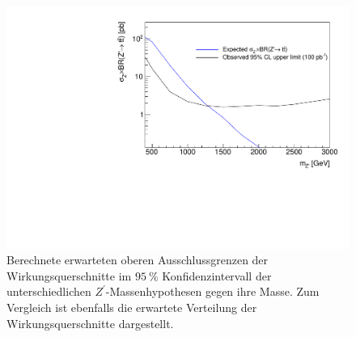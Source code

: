 \begin{figure}
    \centering
    \includegraphics[width=\linewidth]{plots_and_txt/limits.pdf}
    \caption{Berechnete erwarteten oberen Ausschlussgrenzen der Wirkungsquerschnitte im $\SI{95}{\percent}$ Konfidenzintervall der unterschiedlichen $Z^\prime$-Massenhypothesen gegen ihre Masse. Zum Vergleich ist ebenfalls die erwartete Verteilung der Wirkungsquerschnitte dargestellt.}
    \label{fig:limit}
\end{figure}
